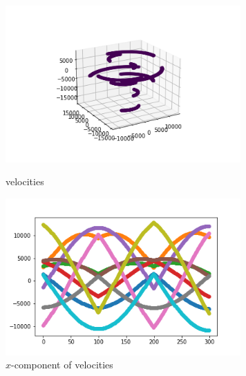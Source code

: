 \documentclass[12pt]{article}
\begin{document}
	\begin{figure}[H]
		\begin{multicols}{2}
			\includegraphics[width=\linewidth, height=6cm]{multivs2Bz.png} \caption{velocities} \label{multivs2Bz} \par
			\includegraphics[width=\linewidth, height=6cm]{multivsx2Bz.png} \caption{$x$-component of velocities} \label{multivsx2Bz} \par
		\end{multicols}
	\end{figure}
\end{document}
